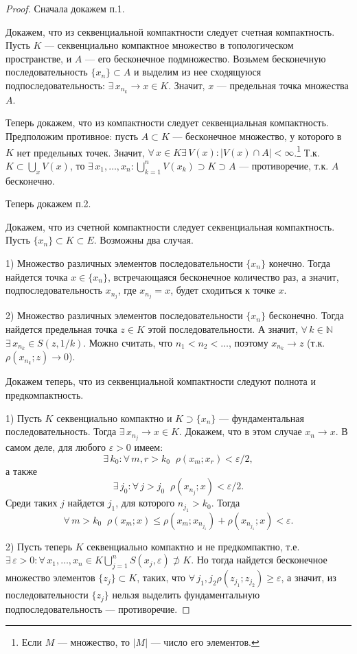 \documentclass[12pt,titlepage, a4paper]{article}
\begin{document}
\begin{proof}
Сначала докажем п.1.

Докажем, что из секвенциальной компактности следует счетная
компактность. Пусть $K$ --- секвенциально компактное множество в
топологическом пространстве, и $A$ --- его бесконечное подмножество.
Возьмем бесконечную последовательность $\{x_n\}\subset A$ и выделим
из нее сходящуюся подпоследовательность: $\exists\, x_{n_k}\to x\in
K$. Значит, $x$ --- предельная точка множества $A$.

Теперь докажем, что из компактности следует секвенциальная
компактность. Предположим противное: пусть $A\subset K$ ---
бесконечное множество, у которого в $K$ нет предельных точек.
Значит, $\forall\,x\in K$\;\;$\exists\,V(x):|V(x)\cap
A|<\infty$.\footnote{Если $M$ --- множество, то $|M|$ --- число его
элементов.} Т.к. $K\subset \bigcup\limits_x V(x)$, то
$\exists\,x_1,\ldots,x_n:\bigcup\limits_{k=1}^nV(x_k)\supset
K\supset A$ --- противоречие, т.к. $A$ бесконечно.

Теперь докажем п.2.

 Докажем, что из счетной компактности следует
секвенциальная компактность. Пусть $\{x_n\}\subset K\subset E$.
Возможны два случая.

1) Множество различных элементов последовательности $\{x_n\}$
конечно. Тогда найдется точка $x\in\{x_n\}$, встречающаяся
бесконечное количество раз, а значит, подпоследовательность
${x_{n_j}}$, где $x_{n_j}=x$, будет сходиться к точке $x$.

2) Множество различных элементов последовательности $\{x_n\}$
бесконечно. Тогда найдется предельная точка $z\in K$ этой
последовательности. А значит,
$\forall\,k\in\mathbb{N}$\;\;$\exists\,x_{n_k}\in S(z,1/k)$. Можно
считать, что $n_1<n_2<\ldots$, поэтому $x_{n_k}\to z$ (т.к.
$\rho(x_{n_k};z)\to 0$).

Докажем теперь, что из секвенциальной компактности следуют полнота и
предкомпактность.

1) Пусть $K$ секвенциально компактно и $K\supset\{x_n\}$ ---
фундаментальная последовательность. Тогда $\exists\,x_{n_j}\to x\in
K$. Докажем, что в этом случае $x_n\to x$. В самом деле, для любого
$\varepsilon>0$ имеем:
$$\exists\,k_0:\forall\,m,r>k_0\;\;\rho(x_m;x_r)<\varepsilon/2,$$
а также
$$\exists\,j_0:\forall\,j>j_0\;\;\rho(x_{n_j};x)<\varepsilon/2.$$
Среди таких $j$ найдется $j_1$, для которого $n_{j_1}>k_0$. Тогда
$$\forall\,m>k_0\;\;\rho(x_m;x)\leqslant
\rho(x_m;x_{n_{j_1}})+\rho(x_{n_{j_1}};x)<\varepsilon.$$

2) Пусть теперь $K$ секвенциально компактно и не предкомпактно, т.е.
$\exists\,\varepsilon>0:\forall\,x_1,\ldots,x_n\in
K$\;\;$\bigcup\limits_{j=1}^n S(x_j,\varepsilon)\not\supset K$. Но
тогда найдется бесконечное множество элементов $\{z_j\}\subset K$,
таких, что
$\forall\,j_1,j_2$\;\;$\rho(z_{j_1};z_{j_2})\geqslant\varepsilon$, а
значит, из последовательности $\{z_j\}$ нельзя выделить
фундаментальную подпоследовательность --- противоречие.


\end{proof}
\end{document}
